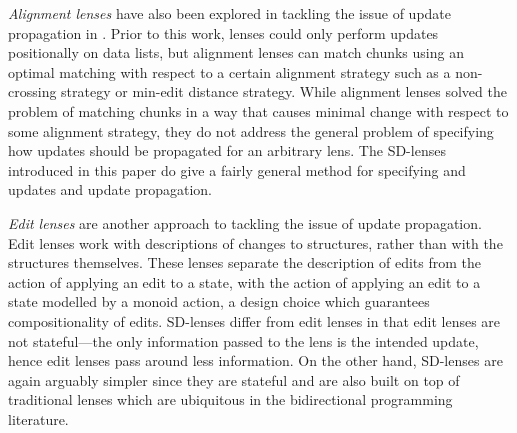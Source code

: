 \documentclass[acmsmall,review,anonymous]{acmart}\settopmatter{printfolios=true,printccs=false,printacmref=false}
\begin{document}
{\em Alignment lenses} have also been explored in tackling the issue of update
propagation in \cite{bohannon2008boomerang,barbosa2010matching}. Prior to this
work, lenses could only perform updates positionally on data lists, but
alignment lenses can match chunks using an optimal matching with
respect to a certain alignment strategy such as a non-crossing strategy or
min-edit distance strategy. While alignment lenses solved the problem of
matching chunks in a way that causes minimal change with respect to some
alignment strategy, they do not address the general problem of specifying how
updates should be propagated for an arbitrary lens. The SD-lenses introduced in
this paper do give a fairly general method for specifying and updates and update
propagation.

{\em Edit lenses} \cite{hofmann2012edit} are another approach to tackling the
issue of update propagation. Edit lenses work with descriptions of changes to
structures, rather than with the structures themselves. These lenses separate
the description of edits from the action of applying an edit to a state, with
the action of applying an edit to a state modelled by a monoid action, a design
choice which guarantees compositionality of edits. SD-lenses differ from edit
lenses in that edit lenses are not stateful---the only information passed to the
lens is the intended update, hence edit lenses pass around less information. On
the other hand, SD-lenses are again arguably simpler since they are stateful
and are also built on top of traditional lenses which are ubiquitous in the
bidirectional programming literature.



\end{document}
